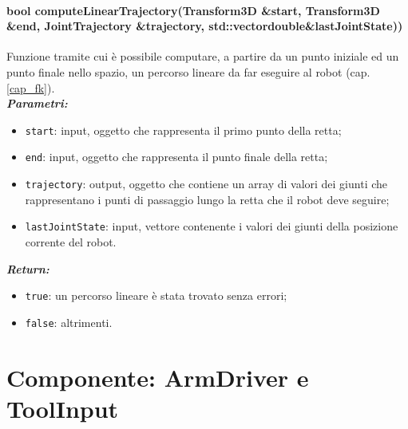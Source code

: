 \paragraph{bool computeLinearTrajectory(Transform3D \&start, Transform3D \&end, JointTrajectory \&trajectory, std::vector\tl double\tr \&lastJointState))}
Funzione tramite cui è possibile computare, a partire da un punto iniziale ed un punto finale nello spazio, un percorso lineare da far eseguire al robot (cap.\ref{cap_fk}). \\
\textbf{\textit{Parametri:}}
\begin{itemize}
	\item \texttt{start}: input, oggetto che rappresenta il primo punto della retta;
	\item \texttt{end}: input, oggetto che rappresenta il punto finale della retta;
	\item \texttt{trajectory}: output, oggetto che contiene un array di valori dei giunti che rappresentano i punti di passaggio lungo la retta che il robot deve seguire;
	\item \texttt{lastJointState}: input, vettore contenente i valori dei giunti della posizione corrente del robot. 
\end{itemize}
\textbf{\textit{Return:}}
\begin{itemize}
	\item \texttt{true}: un percorso lineare è stata trovato senza errori;
	\item \texttt{false}: altrimenti.
\end{itemize}


\section{Componente: ArmDriver e ToolInput}
